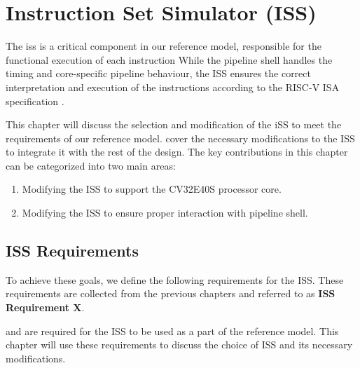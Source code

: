 \chapter{Instruction Set Simulator (ISS)}
\label{ch:ISS}


The \acrfull{iss} is a critical component in our reference model, responsible for the functional execution of each instruction While the pipeline shell handles the timing and core-specific pipeline behaviour, the ISS ensures the correct interpretation and execution of the instructions according to the RISC-V ISA specification \cite{watermanRISCVInstructionSet2019, watermanRISCVInstructionSet2021}.

This chapter will discuss the selection and modification of the iSS to meet the requirements of our reference model. cover the necessary modifications to the ISS to integrate it with the rest of the design. The key contributions in this chapter can be categorized into two main areas:

\begin{enumerate}
    \item Modifying the ISS to support the CV32E40S processor core.
    \item Modifying the ISS to ensure proper interaction with pipeline shell.
\end{enumerate}

\section{ISS Requirements}

To achieve these goals, we define the following requirements for the ISS. These requirements are collected from the previous chapters and referred to as \textbf{ISS Requirement X}.


and are required for the ISS to be used as a part of the reference model. This chapter will use these requirements to discuss the choice of ISS and its necessary modifications. 

